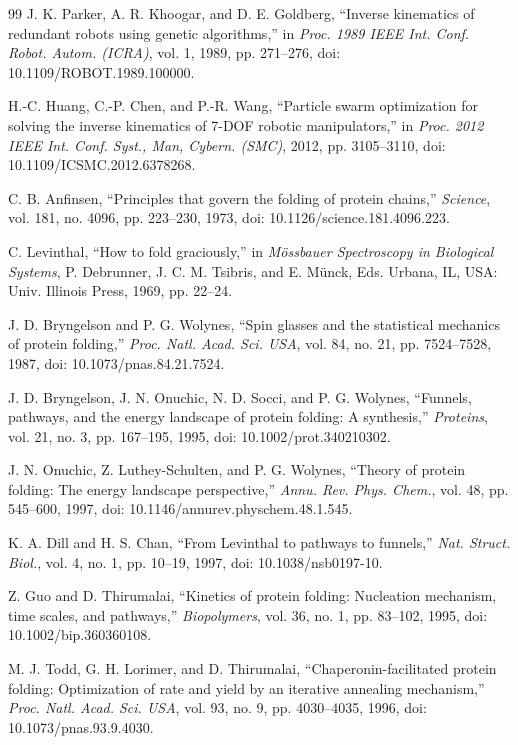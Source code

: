 \documentclass[10pt,conference]{IEEEtran}
\begin{document}
\begin{thebibliography}{99}
J. K. Parker, A. R. Khoogar, and D. E. Goldberg, ``Inverse kinematics of
redundant robots using genetic algorithms,'' in \emph{Proc. 1989 IEEE Int. Conf.
Robot. Autom. (ICRA)}, vol. 1, 1989, pp. 271--276, doi: 10.1109/ROBOT.1989.100000.

H.-C. Huang, C.-P. Chen, and P.-R. Wang, ``Particle swarm optimization for
solving the inverse kinematics of 7-DOF robotic manipulators,'' in \emph{Proc.
2012 IEEE Int. Conf. Syst., Man, Cybern. (SMC)}, 2012, pp. 3105--3110,
doi: 10.1109/ICSMC.2012.6378268.

C. B. Anfinsen, ``Principles that govern the folding of protein chains,''
\emph{Science}, vol. 181, no. 4096, pp. 223--230, 1973,
doi: 10.1126/science.181.4096.223.

C. Levinthal, ``How to fold graciously,'' in \emph{M\"{o}ssbauer Spectroscopy in
Biological Systems}, P. Debrunner, J. C. M. Tsibris, and E. M\"{u}nck, Eds.
Urbana, IL, USA: Univ. Illinois Press, 1969, pp. 22--24.

J. D. Bryngelson and P. G. Wolynes, ``Spin glasses and the statistical mechanics
of protein folding,'' \emph{Proc. Natl. Acad. Sci. USA}, vol. 84, no. 21,
pp. 7524--7528, 1987, doi: 10.1073/pnas.84.21.7524.

J. D. Bryngelson, J. N. Onuchic, N. D. Socci, and P. G. Wolynes, ``Funnels,
pathways, and the energy landscape of protein folding: A synthesis,''
\emph{Proteins}, vol. 21, no. 3, pp. 167--195, 1995, doi: 10.1002/prot.340210302.

J. N. Onuchic, Z. Luthey-Schulten, and P. G. Wolynes, ``Theory of protein
folding: The energy landscape perspective,'' \emph{Annu. Rev. Phys. Chem.},
vol. 48, pp. 545--600, 1997, doi: 10.1146/annurev.physchem.48.1.545.

K. A. Dill and H. S. Chan, ``From Levinthal to pathways to funnels,'' \emph{Nat.
Struct. Biol.}, vol. 4, no. 1, pp. 10--19, 1997, doi: 10.1038/nsb0197-10.

Z. Guo and D. Thirumalai, ``Kinetics of protein folding: Nucleation mechanism,
time scales, and pathways,'' \emph{Biopolymers}, vol. 36, no. 1, pp. 83--102,
1995, doi: 10.1002/bip.360360108.

M. J. Todd, G. H. Lorimer, and D. Thirumalai, ``Chaperonin-facilitated protein
folding: Optimization of rate and yield by an iterative annealing mechanism,''
\emph{Proc. Natl. Acad. Sci. USA}, vol. 93, no. 9, pp. 4030--4035, 1996,
doi: 10.1073/pnas.93.9.4030.


\end{thebibliography}
\end{document}
